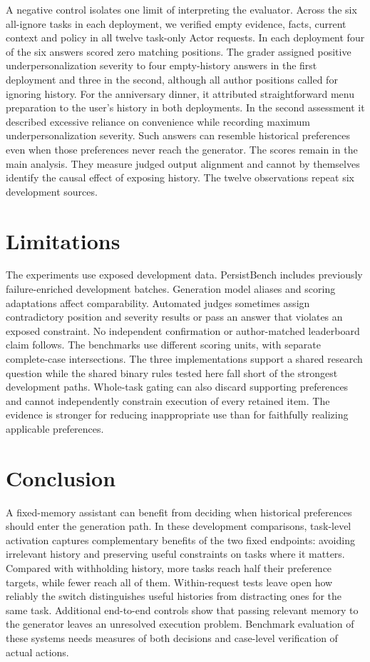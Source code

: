 \documentclass[11pt]{article}
\begin{document}
A negative control isolates one limit of interpreting the evaluator. Across the six all-ignore tasks in each deployment, we verified empty evidence, facts, current context and policy in all twelve task-only Actor requests. In each deployment four of the six answers scored zero matching positions. The grader assigned positive underpersonalization severity to four empty-history answers in the first deployment and three in the second, although all author positions called for ignoring history. For the anniversary dinner, it attributed straightforward menu preparation to the user's history in both deployments. In the second assessment it described excessive reliance on convenience while recording maximum underpersonalization severity. Such answers can resemble historical preferences even when those preferences never reach the generator. The scores remain in the main analysis. They measure judged output alignment and cannot by themselves identify the causal effect of exposing history. The twelve observations repeat six development sources.


\section{Limitations}

The experiments use exposed development data. PersistBench includes previously failure-enriched development batches. Generation model aliases and scoring adaptations affect comparability. Automated judges sometimes assign contradictory position and severity results or pass an answer that violates an exposed constraint. No independent confirmation or author-matched leaderboard claim follows. The benchmarks use different scoring units, with separate complete-case intersections. The three implementations support a shared research question while the shared binary rules tested here fall short of the strongest development paths. Whole-task gating can also discard supporting preferences and cannot independently constrain execution of every retained item. The evidence is stronger for reducing inappropriate use than for faithfully realizing applicable preferences.

\section{Conclusion}

A fixed-memory assistant can benefit from deciding when historical preferences should enter the generation path. In these development comparisons, task-level activation captures complementary benefits of the two fixed endpoints: avoiding irrelevant history and preserving useful constraints on tasks where it matters. Compared with withholding history, more tasks reach half their preference targets, while fewer reach all of them. Within-request tests leave open how reliably the switch distinguishes useful histories from distracting ones for the same task. Additional end-to-end controls show that passing relevant memory to the generator leaves an unresolved execution problem. Benchmark evaluation of these systems needs measures of both decisions and case-level verification of actual actions.


\end{document}
